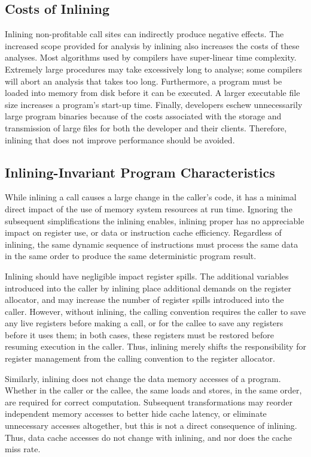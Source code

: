 \subsection{Costs of Inlining}

Inlining non-profitable call sites can indirectly produce negative
effects.  The increased scope provided for analysis by inlining also
increases the costs of these analyses.  Most algorithms used by
compilers have super-linear time complexity.  Extremely large
procedures may take excessively long to analyse; some compilers will
abort an analysis that takes too long.  Furthermore, a program must be
loaded into memory from disk before it can be executed.  A larger
executable file size increases a program's start-up time.  Finally,
developers eschew unnecessarily large program binaries because of the
costs associated with the storage and transmission of large files for
both the developer and their clients. Therefore, inlining that does
not improve performance should be avoided.

\subsection{Inlining-Invariant Program Characteristics}

While inlining a call causes a large change in the caller's code, it
has a minimal direct impact of the use of memory system resources at
run time.  Ignoring the subsequent simplifications the inlining
enables, inlining proper has no appreciable impact on register use, or
data or instruction cache efficiency.  Regardless of inlining, the
same dynamic sequence of instructions must process the same data in
the same order to produce the same deterministic program result.

Inlining should have negligible impact register spills.  The
additional variables introduced into the caller by inlining place
additional demands on the register allocator, and may increase the
number of register spills introduced into the caller.  However,
without inlining, the calling convention requires the caller to
save any live registers before making a call, or for the callee to
save any registers before it uses them; in both cases, these
registers must be restored before resuming execution in the caller.
Thus, inlining merely shifts the responsibility for register
management from the calling convention to the register allocator.

Similarly, inlining does not change the data memory accesses of a
program.  Whether in the caller or the callee, the same loads and
stores, in the same order, are required for correct computation.
Subsequent transformations may reorder independent memory accesses to
better hide cache latency, or eliminate unnecessary accesses
altogether, but this is not a direct consequence of inlining.  Thus,
data cache accesses do not change with inlining, and nor does the
cache miss rate.  

